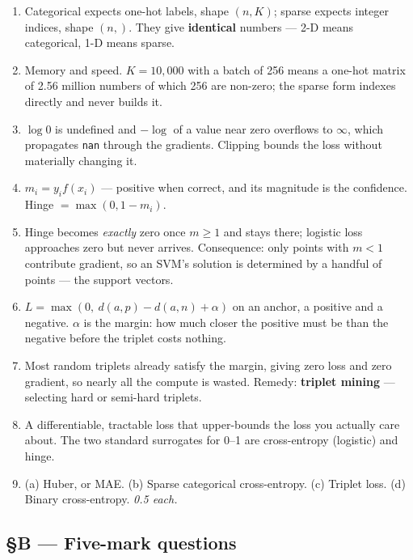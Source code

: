 \documentclass[11pt,a4paper]{article}
\newcommand{\A}[1]{\item[\textbf{#1}]}
\begin{document}
\begin{enumerate}[leftmargin=1.9cm]
\A{U2.9} Categorical expects one-hot labels, shape $(n,K)$; sparse expects
integer indices, shape $(n,)$. They give \textbf{identical} numbers ---
2-D means categorical, 1-D means sparse.

\A{U2.10} Memory and speed. $K = 10{,}000$ with a batch of 256 means a one-hot
matrix of 2.56 million numbers of which 256 are non-zero; the sparse form
indexes directly and never builds it.

\A{U2.11} $\log 0$ is undefined and $-\log$ of a value near zero overflows to
$\infty$, which propagates \texttt{nan} through the gradients. Clipping bounds
the loss without materially changing it.

\A{U2.12} $m_i = y_i f(x_i)$ --- positive when correct, and its magnitude is
the confidence. Hinge $= \max(0, 1 - m_i)$.

\A{U2.13} Hinge becomes \emph{exactly} zero once $m \ge 1$ and stays there;
logistic loss approaches zero but never arrives. Consequence: only points with
$m < 1$ contribute gradient, so an SVM's solution is determined by a handful of
points --- the support vectors.

\A{U2.14} $L = \max(0,\ d(a,p) - d(a,n) + \alpha)$ on an anchor, a positive and
a negative. $\alpha$ is the margin: how much closer the positive must be than
the negative before the triplet costs nothing.

\A{U2.15} Most random triplets already satisfy the margin, giving zero loss and
zero gradient, so nearly all the compute is wasted. Remedy: \textbf{triplet
mining} --- selecting hard or semi-hard triplets.

\A{U2.16} A differentiable, tractable loss that upper-bounds the loss you
actually care about. The two standard surrogates for 0--1 are cross-entropy
(logistic) and hinge.

\A{U2.17} (a) Huber, or MAE. (b) Sparse categorical cross-entropy.
(c) Triplet loss. (d) Binary cross-entropy.
\emph{0.5 each.}
\end{enumerate}

\subsection*{§B --- Five-mark questions}
\end{document}

